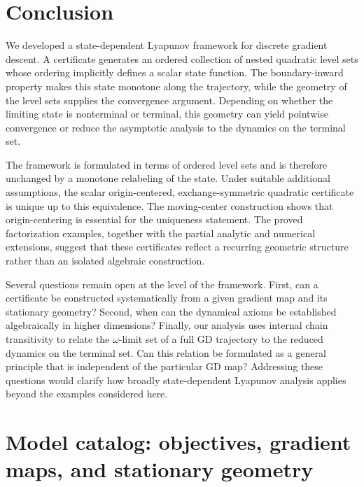 \documentclass{article}
\begin{document}
\section{Conclusion}

We developed a state-dependent Lyapunov framework for discrete gradient
descent. A certificate generates an ordered collection of nested quadratic
level sets whose ordering implicitly defines a scalar state function. The
boundary-inward property makes this state monotone along the trajectory, while
the geometry of the level sets supplies the convergence argument. Depending on
whether the limiting state is nonterminal
or terminal, this geometry can yield pointwise convergence or reduce the
asymptotic analysis to the dynamics on the terminal set.

The framework is formulated in terms of ordered level sets and is therefore
unchanged by a monotone relabeling of the state. Under suitable additional
assumptions, the scalar origin-centered, exchange-symmetric quadratic
certificate is unique up to this equivalence. The moving-center construction
shows that origin-centering is essential for the uniqueness statement. The
proved factorization examples, together with the partial analytic and numerical
extensions, suggest that these certificates reflect a recurring geometric
structure rather than an isolated algebraic construction.

Several questions remain open at the level of the framework. First, can a
certificate be constructed systematically from a given gradient map and its
stationary geometry? Second, when can the dynamical axioms be established
algebraically in higher dimensions? Finally, our analysis uses internal chain
transitivity to relate the $\omega$-limit set of a full GD trajectory to the
reduced dynamics on the terminal set. Can this relation be formulated as a
general principle that is independent of the particular GD map? Addressing
these questions would clarify how broadly state-dependent Lyapunov analysis
applies beyond the examples considered here.





\appendix

\section{Model catalog: objectives, gradient maps, and stationary geometry}
\label{apx:model_catalog}
\end{document}
